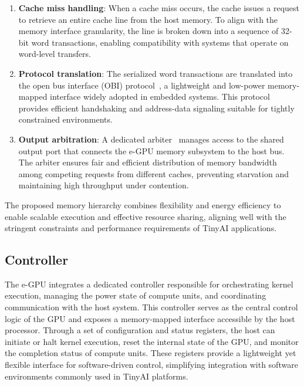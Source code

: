             \vspace{-1em}
            \begin{enumerate}
                \item \textbf{Cache miss handling}: When a cache miss occurs, the cache issues a request to retrieve an entire cache line from the host memory. To align with the memory interface granularity, the line is broken down into a sequence of 32-bit word transactions, enabling compatibility with systems that operate on word-level transfers.
            
                \item \textbf{Protocol translation}: The serialized word transactions are translated into the open bus interface (OBI) protocol~\cite{obi}, a lightweight and low-power memory-mapped interface widely adopted in embedded systems. This protocol provides efficient handshaking and address-data signaling suitable for tightly constrained environments.
            
                \item \textbf{Output arbitration}: A dedicated arbiter~\cite{bus} manages access to the shared output port that connects the \mbox{e-GPU} memory subsystem to the host bus. The arbiter ensures fair and efficient distribution of memory bandwidth among competing requests from different caches, preventing starvation and maintaining high throughput under contention.
            \end{enumerate}
            \vspace{-1em}
            
            The proposed memory hierarchy combines flexibility and energy efficiency to enable scalable execution and effective resource sharing, aligning well with the stringent constraints and performance requirements of TinyAI applications.

        \subsection{Controller}
        
            The \mbox{e-GPU} integrates a dedicated controller responsible for orchestrating kernel execution, managing the power state of compute units, and coordinating communication with the host system. This controller serves as the central control logic of the GPU and exposes a memory-mapped interface accessible by the host processor. Through a set of configuration and status registers, the host can initiate or halt kernel execution, reset the internal state of the GPU, and monitor the completion status of compute units. These registers provide a lightweight yet flexible interface for software-driven control, simplifying integration with software environments commonly used in TinyAI platforms.
            
